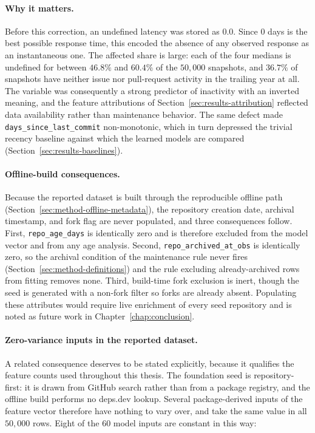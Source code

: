 \paragraph{Why it matters.} Before this correction, an undefined latency was stored as \(0.0\). Since \(0\) days is the best possible response time, this encoded the absence of any observed response as an instantaneous one. The affected share is large: each of the four medians is undefined for between \(46.8\%\) and \(60.4\%\) of the \(50{,}000\) snapshots, and \(36.7\%\) of snapshots have neither issue nor pull-request activity in the trailing year at all. The variable was consequently a strong predictor of inactivity with an inverted meaning, and the feature attributions of Section~\ref{sec:results-attribution} reflected data availability rather than maintenance behavior. The same defect made \texttt{days\_since\_last\_commit} non-monotonic, which in turn depressed the trivial recency baseline against which the learned models are compared (Section~\ref{sec:results-baselines}).

\paragraph{Offline-build consequences.} Because the reported dataset is built through the reproducible offline path (Section~\ref{sec:method-offline-metadata}), the repository creation date, archival timestamp, and fork flag are never populated, and three consequences follow. First, \texttt{repo\_age\_days} is identically zero and is therefore excluded from the model vector and from any age analysis. Second, \texttt{repo\_archived\_at\_obs} is identically zero, so the archival condition of the maintenance rule never fires (Section~\ref{sec:method-definitions}) and the rule excluding already-archived rows from fitting removes none. Third, build-time fork exclusion is inert, though the seed is generated with a non-fork filter so forks are already absent. Populating these attributes would require live enrichment of every seed repository and is noted as future work in Chapter~\ref{chap:conclusion}.

\paragraph{Zero-variance inputs in the reported dataset.} A related consequence deserves to be stated explicitly, because it qualifies the feature counts used throughout this thesis. The foundation seed is repository-first: it is drawn from GitHub search rather than from a package registry, and the offline build performs no deps.dev lookup. Several package-derived inputs of the feature vector therefore have nothing to vary over, and take the same value in all \(50{,}000\) rows. Eight of the \(60\) model inputs are constant in this way:

